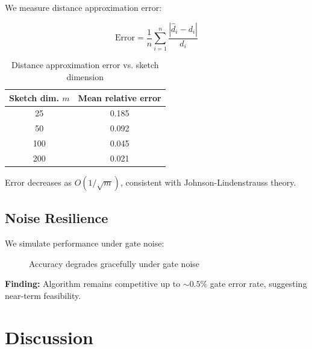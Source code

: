 \documentclass[11pt]{article}
\begin{document}
We measure distance approximation error:

\begin{equation}
\text{Error} = \frac{1}{n} \sum_{i=1}^n \frac{|\hat{d}_i - d_i|}{d_i}
\end{equation}

\begin{table}[ht]
\centering
\caption{Distance approximation error vs. sketch dimension}
\begin{tabular}{cc}
\toprule
\textbf{Sketch dim. $m$} & \textbf{Mean relative error} \\
\midrule
25 & 0.185 \\
50 & 0.092 \\
100 & 0.045 \\
200 & 0.021 \\
\bottomrule
\end{tabular}
\end{table}

Error decreases as $O(1/\sqrt{m})$, consistent with Johnson-Lindenstrauss theory.

\subsection{Noise Resilience}

We simulate performance under gate noise:

\begin{figure}[ht]
\centering
{}
\caption{Accuracy degrades gracefully under gate noise}
\label{fig:noise}
\end{figure}

\textbf{Finding:} Algorithm remains competitive up to $\sim 0.5\%$ gate error rate, suggesting near-term feasibility.

\section{Discussion}
\label{sec:discussion}
\end{document}
